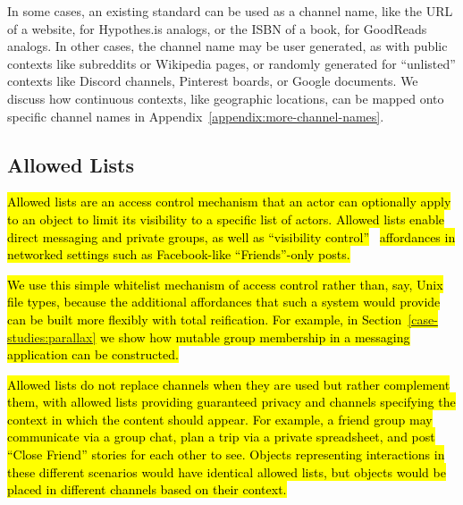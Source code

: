 In some cases, an existing standard can be used as a channel
name, like the URL of a website, for Hypothes.is analogs,
or the ISBN of a book, for GoodReads analogs.
In other cases, the channel name may be user generated,
as with public contexts like subreddits or Wikipedia pages,
or randomly generated for ``unlisted'' contexts like
Discord channels, Pinterest boards, or Google documents.
We discuss how continuous contexts, like geographic locations, can be
mapped onto specific channel names in Appendix~\ref{appendix:more-channel-names}.

\subsection{Allowed Lists}
\label{concepts:allowed-lists}

\hl{%
Allowed lists are an access control mechanism
that an actor can optionally apply to an object
to limit its visibility to a specific list of actors.
Allowed lists enable direct messaging and private groups,
as well as ``visibility control''}~\cite{visibilitycontrol, toogayforfacebook}
\hl{affordances in networked settings such as
Facebook-like ``Friends''-only posts.
}%

\hl{%
We use this simple whitelist mechanism of access control rather than,
say, Unix file types, because the additional affordances that
such a system would provide can be built more flexibly with total reification.
For example, in Section~{\ref{case-studies:parallax}} we show how mutable group
membership in a messaging application can be constructed.
}%

\hl{%
Allowed lists do not replace channels when they are used
but rather complement them,
with allowed lists providing guaranteed privacy
and channels specifying the context in which the content should appear.
For example, a friend group may communicate via a group chat,
plan a trip via a private spreadsheet, and post ``Close Friend'' stories
for each other to see.
Objects representing interactions in these different scenarios
would have identical allowed lists,
but objects would be placed in different channels based on their context.
}%
